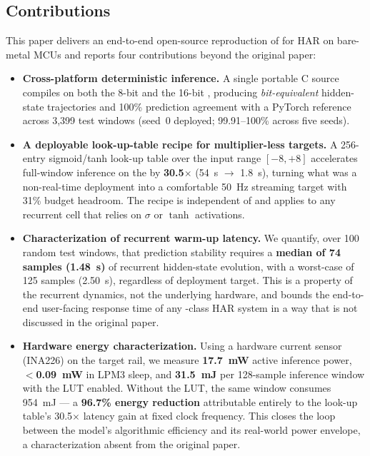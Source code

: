 \subsection{Contributions}

This paper delivers an end-to-end open-source reproduction of
\fastgrnn{} for HAR on bare-metal MCUs and reports four
contributions beyond the original paper:

\begin{itemize}
\item \textbf{Cross-platform deterministic inference.} A single
portable C source compiles on both the 8-bit \arduino{} and the
16-bit \msp{}, producing \emph{bit-equivalent} hidden-state
trajectories and 100\% prediction agreement with a PyTorch
reference across 3{,}399 test windows (seed~0 deployed;
99.91--100\% across five seeds).

\item \textbf{A deployable look-up-table recipe for multiplier-less
targets.} A 256-entry sigmoid/tanh look-up table over the input
range $[-8, +8]$ accelerates full-window inference on the \msp{} by
\textbf{30.5$\times$} (54~s $\rightarrow$ 1.8~s), turning what was
a non-real-time deployment into a comfortable 50~Hz streaming
target with 31\% budget headroom. The recipe is independent of
\fastgrnn{} and applies to any recurrent cell that relies on
$\sigma$ or $\tanh$ activations.

\item \textbf{Characterization of recurrent warm-up latency.} We
quantify, over 100 random test windows, that prediction stability
requires a \textbf{median of 74 samples (1.48~s)} of recurrent
hidden-state evolution, with a worst-case of 125 samples (2.50~s),
regardless of deployment target. This is a property of the
recurrent dynamics, not the underlying hardware, and bounds the
end-to-end user-facing response time of any \fastgrnn{}-class HAR
system in a way that is not discussed in the original paper.

\item \textbf{Hardware energy characterization.} Using a hardware
current sensor (INA226) on the \msp{} target rail, we measure
\textbf{17.7~mW} active inference power, \textbf{$<$0.09~mW} in
LPM3 sleep, and \textbf{31.5~mJ} per 128-sample inference window
with the LUT enabled. Without the LUT, the same window consumes
954~mJ --- a \textbf{96.7\% energy reduction} attributable
entirely to the look-up table's 30.5$\times$ latency gain at
fixed clock frequency. This closes the loop between the model's
algorithmic efficiency and its real-world power envelope, a
characterization absent from the original \fastgrnn{} paper.
\end{itemize}

